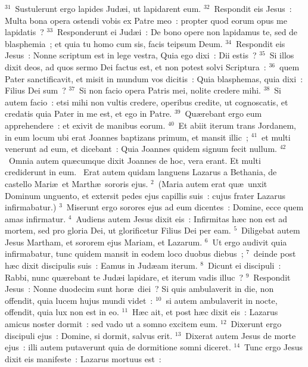 ${}^{31}$~Sustulerunt ergo lapides Jud\ae i, ut lapidarent eum.
${}^{32}$~Respondit eis Jesus~: Multa bona opera ostendi vobis ex Patre meo~: propter quod eorum opus me lapidatis~?
${}^{33}$~Responderunt ei Jud\ae i~: De bono opere non lapidamus te, sed de blasphemia~; et quia tu homo cum sis, facis teipsum Deum.
${}^{34}$~Respondit eis Jesus~: Nonne scriptum est in lege vestra, Quia ego dixi~: Dii estis~?
${}^{35}$~Si illos dixit deos, ad quos sermo Dei factus est, et non potest solvi Scriptura~:
${}^{36}$~quem Pater sanctificavit, et misit in mundum vos dicitis~: Quia blasphemas, quia dixi~: Filius Dei sum~?
${}^{37}$~Si non facio opera Patris mei, nolite credere mihi.
${}^{38}$~Si autem facio~: etsi mihi non vultis credere, operibus credite, ut cognoscatis, et credatis quia Pater in me est, et ego in Patre.
${}^{39}$~Qu\ae rebant ergo eum apprehendere~: et exivit de manibus eorum.
${}^{40}$~Et abiit iterum trans Jordanem, in eum locum ubi erat Joannes baptizans primum, et mansit illic~;
${}^{41}$~et multi venerunt ad eum, et dicebant~: Quia Joannes quidem signum fecit nullum.
${}^{42}$~Omnia autem qu\ae cumque dixit Joannes de hoc, vera erant. Et multi crediderunt in eum.
~Erat autem quidam languens Lazarus a Bethania, de castello Mari\ae\ et Marth\ae\ sororis ejus.
${}^{2}$~(Maria autem erat qu\ae\ unxit Dominum unguento, et extersit pedes ejus capillis suis~: cujus frater Lazarus infirmabatur.)
${}^{3}$~Miserunt ergo sorores ejus ad eum dicentes~: Domine, ecce quem amas infirmatur.
${}^{4}$~Audiens autem Jesus dixit eis~: Infirmitas h\ae c non est ad mortem, sed pro gloria Dei, ut glorificetur Filius Dei per eam.
${}^{5}$~Diligebat autem Jesus Martham, et sororem ejus Mariam, et Lazarum.
${}^{6}$~Ut ergo audivit quia infirmabatur, tunc quidem mansit in eodem loco duobus diebus~;
${}^{7}$~deinde post h\ae c dixit discipulis suis~: Eamus in Jud\ae am iterum.
${}^{8}$~Dicunt ei discipuli~: Rabbi, nunc qu\ae rebant te Jud\ae i lapidare, et iterum vadis illuc~?
${}^{9}$~Respondit Jesus~: Nonne duodecim sunt hor\ae\ diei~? Si quis ambulaverit in die, non offendit, quia lucem hujus mundi videt~:
${}^{10}$~si autem ambulaverit in nocte, offendit, quia lux non est in eo.
${}^{11}$~H\ae c ait, et post h\ae c dixit eis~: Lazarus amicus noster dormit~: sed vado ut a somno excitem eum.
${}^{12}$~Dixerunt ergo discipuli ejus~: Domine, si dormit, salvus erit.
${}^{13}$~Dixerat autem Jesus de morte ejus~: illi autem putaverunt quia de dormitione somni diceret.
${}^{14}$~Tunc ergo Jesus dixit eis manifeste~: Lazarus mortuus est~:
